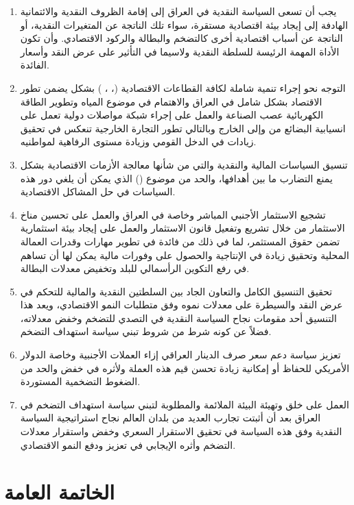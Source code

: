 \documentclass[10pt,a4paper]{report}
\begin{document}
\begin{doublespacing}
\begin{enumerate}
	\item يجب أن تسعى السياسة النقدية في العراق إلى إقامة الظروف النقدية والائتمانية الهادفة إلى إيجاد بيئة اقتصادية مستقرة، سواء تلك الناتجة عن المتغيرات النقدية، أو الناتجة عن أسباب اقتصادية أخرى كالتضخم والبطالة والركود الاقتصادي. وأن تكون الأداة المهمة الرئيسة للسلطة النقدية ولاسيما في التأثير على عرض النقد وأسعار الفائدة.
	\item التوجه نحو إجراء تنمية شاملة لكافة القطاعات الاقتصادية (، ، ) بشكل يضمن تطور الاقتصاد بشكل شامل في العراق والاهتمام في موضوع المياه وتطوير الطاقة الكهربائية عصب الصناعة والعمل على إجراء شبكة مواصلات دولية تعمل على انسيابية البضائع من وإلى الخارج وبالتالي تطور التجارة الخارجية تنعكس في تحقيق زيادات في الدخل القومي وزيادة مستوى الرفاهية لمواطنيه.
	\item تنسيق السياسات المالية والنقدية والتي من شأنها معالجة الأزمات الاقتصادية بشكل يمنع التضارب ما بين أهدافها، والحد من موضوع () الذي يمكن أن يلغي دور هذه السياسات في حل المشاكل الاقتصادية.
	\item تشجيع الاستثمار الأجنبي المباشر وخاصة في العراق والعمل على تحسين مناخ الاستثمار من خلال تشريع وتفعيل قانون الاستثمار والعمل على إيجاد بيئة استثمارية تضمن حقوق المستثمر، لما في ذلك من فائدة في تطوير مهارات وقدرات العمالة المحلية وتحقيق زيادة في الإنتاجية والحصول على وفورات مالية يمكن لها أن تساهم في رفع التكوين الرأسمالي للبلد وتخفيض معدلات البطالة.
	\item تحقيق التنسيق الكامل والتعاون الجاد بين السلطتين النقدية والمالية للتحكم في عرض النقد والسيطرة على معدلات نموه وفق متطلبات النمو الاقتصادي، ويعد هذا التنسيق أحد مقومات نجاح السياسة النقدية في التصدي للتضخم وخفض معدلاته، فضلاً عن كونه شرط من شروط تبني سياسة استهداف التضخم.
	\item تعزيز سياسة دعم سعر صرف الدينار العراقي إزاء العملات الأجنبية وخاصة الدولار الأمريكي للحفاظ أو إمكانية زيادة تحسن قيم هذه العملة ولأثره في خفض والحد من الضغوط التضخمية المستوردة.
	\item العمل على خلق وتهيئة البيئة الملائمة والمطلوبة لتبني سياسة استهداف التضخم في العراق بعد أن أثبتت تجارب العديد من بلدان العالم نجاح استراتيجية السياسة النقدية وفق هذه السياسة في تحقيق الاستقرار السعري وخفض واستقرار معدلات التضخم وأثره الإيجابي في تعزيز ودفع النمو الاقتصادي.
\end{enumerate}
\chapter{الخاتمة العامة}
\thispagestyle{empty}
\clearpage

\end{doublespacing}
\end{document}
